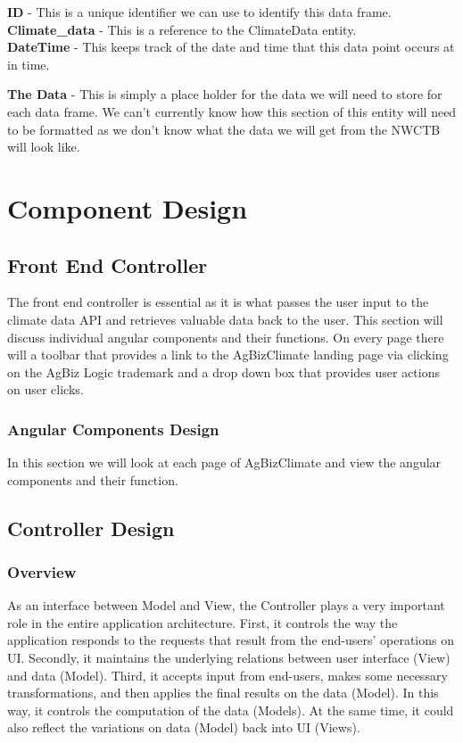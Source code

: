 \documentclass[onecolumn, draftclsnofoot,10pt, compsoc]{article}
\begin{document}
					\textbf{ID} - This is a unique identifier we can use to identify this data frame.\\

					\textbf{Climate\_data} - This is a reference to the ClimateData entity.\\

					\textbf{DateTime} - This keeps track of the date and time that this data point occurs at in time.

					\textbf{The Data} - This is simply a place holder for the data we will need to store for each data frame. We can't currently know how this section of this entity will need to be formatted as we don't know what the data we will get from the NWCTB will look like.\\





\section{Component Design}

	\subsection{Front End Controller}
		The front end controller is essential as it is what passes the user input to the climate data API and retrieves valuable data back to the user. This section will discuss individual angular components and their functions. On every page there will a toolbar that provides a link to the AgBizClimate landing page via clicking on the AgBiz Logic trademark and a drop down box that provides user actions on user clicks.
		\subsubsection{Angular Components Design}
		In this section we will look at each page of AgBizClimate and view the angular components and their function.

	\subsection{Controller Design}
			\subsubsection{Overview}
			As an interface between Model and View, the Controller plays a very important role in the entire application architecture. First, it controls the way the application responds to the requests that result from the end-users' operations on UI. Secondly, it maintains the underlying relations between user interface (View) and data (Model). Third, it accepts input from end-users, makes some necessary transformations, and then applies the final results on the data (Model). In this way, it controls the computation of the data (Models). At the same time, it could also reflect the variations on data (Model) back into UI (Views). \\
\end{document}
